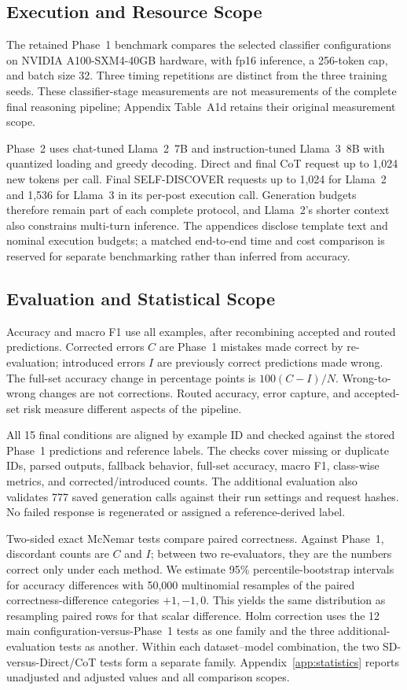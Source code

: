 \documentclass{ieeeaccess}
\begin{document}
\subsection{Execution and Resource Scope}
The retained Phase~1 benchmark compares the selected classifier configurations on NVIDIA A100-SXM4-40GB hardware, with fp16 inference, a 256-token cap, and batch size 32. Three timing repetitions are distinct from the three training seeds. These classifier-stage measurements are not measurements of the complete final reasoning pipeline; Appendix Table~A1d retains their original measurement scope.

Phase~2 uses chat-tuned Llama~2~7B and instruction-tuned Llama~3~8B with quantized loading and greedy decoding. Direct and final CoT request up to 1,024 new tokens per call. Final SELF-DISCOVER requests up to 1,024 for Llama~2 and 1,536 for Llama~3 in its per-post execution call. Generation budgets therefore remain part of each complete protocol, and Llama~2's shorter context also constrains multi-turn inference. The appendices disclose template text and nominal execution budgets; a matched end-to-end time and cost comparison is reserved for separate benchmarking rather than inferred from accuracy.

\subsection{Evaluation and Statistical Scope}
Accuracy and macro F1 use all examples, after recombining accepted and routed predictions. Corrected errors $C$ are Phase~1 mistakes made correct by re-evaluation; introduced errors $I$ are previously correct predictions made wrong. The full-set accuracy change in percentage points is $100(C-I)/N$. Wrong-to-wrong changes are not corrections. Routed accuracy, error capture, and accepted-set risk measure different aspects of the pipeline.

All 15 final conditions are aligned by example ID and checked against the stored Phase~1 predictions and reference labels. The checks cover missing or duplicate IDs, parsed outputs, fallback behavior, full-set accuracy, macro F1, class-wise metrics, and corrected/introduced counts. The additional evaluation also validates 777 saved generation calls against their run settings and request hashes. No failed response is regenerated or assigned a reference-derived label.

Two-sided exact McNemar tests compare paired correctness. Against Phase~1, discordant counts are $C$ and $I$; between two re-evaluators, they are the numbers correct only under each method. We estimate 95\% percentile-bootstrap intervals for accuracy differences with 50,000 multinomial resamples of the paired correctness-difference categories $+1,-1,0$. This yields the same distribution as resampling paired rows for that scalar difference. Holm correction uses the 12 main configuration-versus-Phase~1 tests as one family and the three additional-evaluation tests as another. Within each dataset--model combination, the two SD-versus-Direct/CoT tests form a separate family. Appendix~\ref{app:statistics} reports unadjusted and adjusted values and all comparison scopes.
\end{document}
